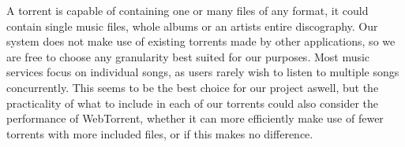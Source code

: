 A torrent is capable of containing one or many files of any format, 
it could contain single music files, whole albums or an artists entire discography.
Our system does not make use of existing torrents made by other applications,
so we are free to choose any granularity best suited for our purposes.
Most music services focus on individual songs, 
as users rarely wish to listen to multiple songs concurrently.
This seems to be the best choice for our project aswell, 
but the practicality of what to include in each of our torrents 
could also consider the performance of WebTorrent,
whether it can more efficiently make use of fewer torrents with more included files, 
or if this makes no difference.
